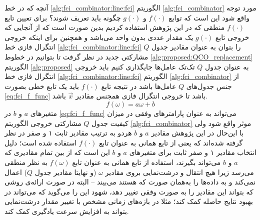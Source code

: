 آنچه که در خط \ref{alg:fci_combinator:line:fci} الگوریتم \ref{alg:fci_combinator} مورد توجه واقع شود این است که توابع $f(\cdot)$ و $g(\cdot)$ چگونه باید تعریف شوند؟ برای تعیین تابع $f(\cdot)$ منطقی که در این پژوهش استفاده کردیم بدین صورت است که از آنجایی که خروجی تابع $g(\cdot)$   یک مقدار عددی بدون واحد می‌باشد و همچنین برای اینکه خروجی انتگرال فازی خط \ref{alg:fci_combinator:line:fci} را بتوان به عنوان مقادیر جدول $Q$ مشارکتی جدید در نظر گرفت تا بتوانیم در خطوط \ref{alg:proposed:QCO_replacement} الگوریتم \ref{alg:proposed} به عنوان جدول $Q$ تک‌تک عامل‌ها جایگذاری کنیم باید خروجی انتگرال فازی خط \ref{alg:fci_combinator:line:fci} الگوریتم \ref{alg:fci_combinator} از جنس جدول‌های $Q$ عامل‌ها باشد در نتیجه تابع $f(\cdot)$ باید یک تابع خطی بصورت \ref{eq:fci_f_func} باشد تا خروجی انتگرال فازی همجنس مقادیر $\vec{x}$ باشد.
\begin{equation}\label{eq:fci_f_func}
f(\omega) = a\omega + b
\end{equation}
متغیر‌های $a$ و $b$ در \ref{eq:fci_f_func} می‌تواند به عنوان پارامترهای وفقی در میزان کیفیت جدول $Q$ مشارکتی خروجی الگوریتم \ref{alg:fci_combinator} موثر واقع شود ولی با این‌حال در این پژوهش مقادیر $a$ و $b$ هردو به ترتیب مقادیر ثابت ۱ و صفر در نظر گرفته شده‌اند که یعنی از تابع همانی به عنوان تابع $f(\cdot)$ استفاده شده است؛ دلیل انتخاب مقادیر ۱ و صفر ثابت برای متغیرهای $a$ و $b$ این است که از بین تمام مقادیری که $a$ و $b$ می‌تواند بگیرند، استفاده‌ از تابع همانی به عنوان تابع $f(\omega)$ به نظر منطقی می‌رسد زیرا هیچ انتقال و درشت‌نمایی بروی مقادیر $\omega$ (و نهایتا مقادیر جدول $Q$) اعمال نمی‌کند و به داده‌ها را به‌همان صورت که هستند می‌بیند -- البته در صورت ارائه‌ی روشی که بتواند این مقادیر را به صورت وفقی تغییر دهد، شهود این را می‌گوید که می‌تواند در بهبود نتایج حاصله کمک کند؛ مثلا در بازه‌های زمانی مشخص با تغییر مقدار درشت‌نمایی بتواند به افزایش سرعت یادگیری کمک کند.

